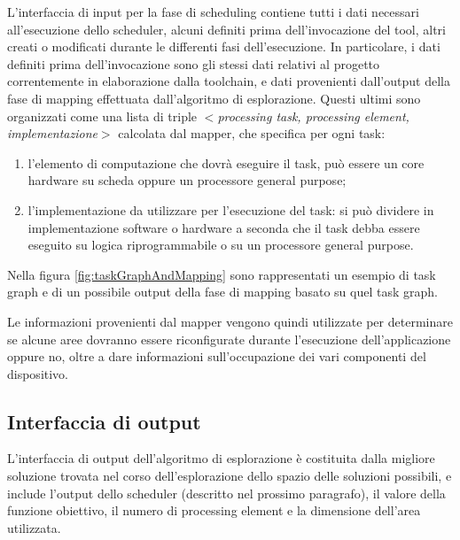 L'interfaccia di input per la fase di scheduling contiene tutti i dati 
necessari all'esecuzione dello scheduler, alcuni definiti prima 
dell'invocazione del tool, altri creati o modificati durante le differenti fasi 
dell'esecuzione. In particolare, i dati definiti prima dell'invocazione sono
gli stessi dati relativi al progetto correntemente in elaborazione dalla toolchain,
e dati provenienti dall'output della fase di mapping effettuata dall'algoritmo di esplorazione.
Questi ultimi sono organizzati come una lista di triple \emph{$<$processing 
task, processing element, implementazione$>$} calcolata dal mapper, che 
specifica per ogni task:
\begin{enumerate}
 \item l'elemento di computazione che dovrà eseguire il task, può essere un 
core hardware su scheda oppure un processore general purpose;
 \item l'implementazione da utilizzare per l'esecuzione del task: si può 
dividere in implementazione software o hardware a seconda che il task debba 
essere eseguito su logica riprogrammabile o su un processore general purpose.
\end{enumerate}
Nella figura \ref{fig:taskGraphAndMapping} sono rappresentati un esempio di 
task graph e di un possibile output della fase di mapping basato su quel task graph.

Le informazioni provenienti dal mapper vengono quindi utilizzate per 
determinare se alcune aree dovranno essere riconfigurate durante l'esecuzione 
dell'applicazione oppure no, oltre a dare informazioni sull'occupazione dei 
vari componenti del dispositivo.


\subsection{Interfaccia di output}
L'interfaccia di output dell'algoritmo di esplorazione \`e costituita dalla
migliore soluzione trovata nel corso dell'esplorazione dello spazio delle soluzioni
possibili, e include l'output dello scheduler (descritto nel prossimo paragrafo),
il valore della funzione obiettivo, il numero di processing element e
la dimensione dell'area utilizzata.


